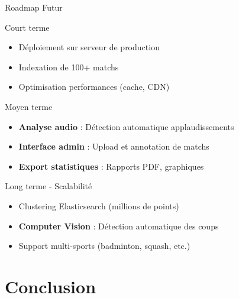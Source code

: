 \documentclass[11pt]{beamer}
\begin{document}
\begin{frame}{Roadmap Futur}
\begin{block}{Court terme}
\begin{itemize}
    \item Déploiement sur serveur de production
    \item Indexation de 100+ matchs
    \item Optimisation performances (cache, CDN)
\end{itemize}
\end{block}

\begin{block}{Moyen terme}
\begin{itemize}
    \item \textbf{Analyse audio} : Détection automatique applaudissements
    \item \textbf{Interface admin} : Upload et annotation de matchs
    \item \textbf{Export statistiques} : Rapports PDF, graphiques
\end{itemize}
\end{block}

\begin{block}{Long terme - Scalabilité}
\begin{itemize}
    \item Clustering Elasticsearch (millions de points)
    \item \textbf{Computer Vision} : Détection automatique des coups
    \item Support multi-sports (badminton, squash, etc.)
\end{itemize}
\end{block}
\end{frame}

\section{Conclusion}
\end{document}

